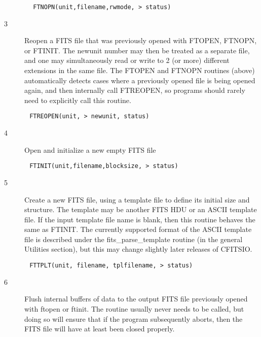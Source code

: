 \documentclass[11pt]{book}
\begin{document}
\begin{verbatim}
        FTNOPN(unit,filename,rwmode, > status)
\end{verbatim}

\begin{description}
\item[3 ] Reopen a FITS file that was previously opened with
    FTOPEN, FTNOPN, or FTINIT.  The newunit number
    may then be treated as a separate file, and one may
    simultaneously read or write to 2 (or more)  different extensions in
    the same file.   The FTOPEN and FTNOPN routines (above) automatically
    detects cases where a previously opened file is being opened again,
    and then internally call FTREOPEN, so programs should rarely
   need to explicitly call this routine.
\end{description}

\begin{verbatim}
       FTREOPEN(unit, > newunit, status)
\end{verbatim}

\begin{description}
\item[4 ]Open and initialize a new empty FITS file
\end{description}

\begin{verbatim}
       FTINIT(unit,filename,blocksize, > status)
\end{verbatim}

\begin{description}
\item[5 ]  Create a new FITS file, using a template file to define its
  initial size and structure.  The template may be another FITS HDU
  or an ASCII template file.  If the input template file name
  is blank, then this routine behaves the same as FTINIT.
  The currently supported format of the ASCII template file is described
  under the fits\_parse\_template routine (in the general Utilities
  section), but this may change slightly later releases of
 CFITSIO.
\end{description}

\begin{verbatim}
       FTTPLT(unit, filename, tplfilename, > status)
\end{verbatim}

\begin{description}
\item[6 ]Flush internal buffers of data to the output FITS file
   previously opened with ftopen or ftinit.  The routine usually
   never needs to be called, but doing so will ensure that
   if the program subsequently aborts, then the FITS file will
  have at least been closed properly.
\end{description}
\end{document}
